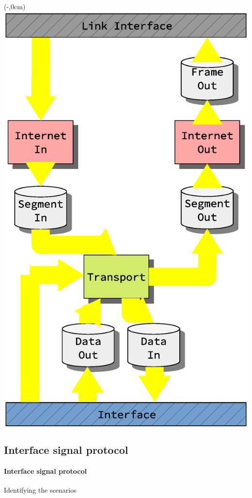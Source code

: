 \begin{frame}[fragile]
    \begin{textblock*}{\displayThumbnail}(\paperwidth-\displayThumbnail-0.2cm,0cm) %
        \colorbox{white}{\includegraphics[width=\textwidth]{implementation/design_2_busses.eps}}
    \end{textblock*}
    \frametitle{\ImplementationTitle}
    \subsection{Interface signal protocol}
    \framesubtitle{Interface signal protocol}
Identifying the scenarios


\end{frame}

